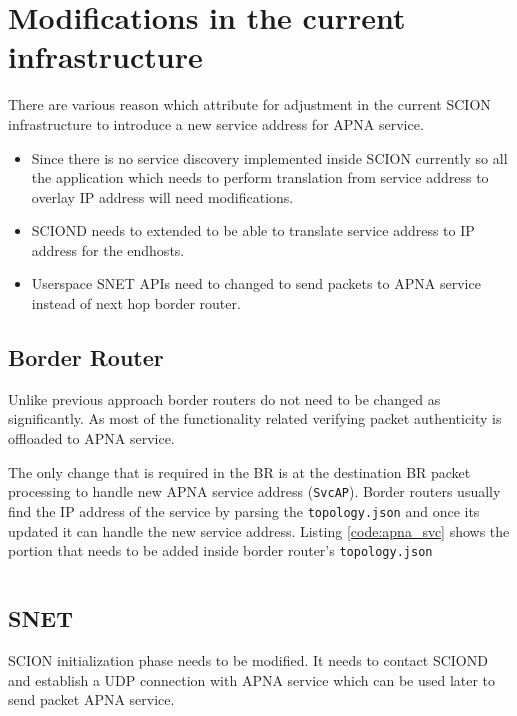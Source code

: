 \section{Modifications in the current infrastructure}
There are various reason which attribute for adjustment in the current SCION infrastructure to introduce a new service address for APNA service.

\begin{itemize}
    \item Since there is no service discovery implemented inside SCION currently so all the application which needs to perform translation from service address to overlay IP address will need modifications.
    \item SCIOND needs to extended to be able to translate service address to IP address for the endhosts.
    \item Userspace SNET APIs need to changed to send packets to APNA service instead of next hop border router.
\end{itemize}

\subsection{Border Router}
Unlike previous approach border routers do not need to be changed as significantly. As most of the functionality related verifying packet authenticity is offloaded to APNA service.

The only change that is required in the BR is at the destination BR packet processing to handle new APNA service address (\texttt{SvcAP}). Border routers usually find the IP address of the service by parsing the \texttt{topology.json} and once its updated it can handle the new service address. Listing \ref{code:apna_svc} shows the portion that needs to be added inside border router's \texttt{topology.json}

\begin{code}
\inputminted[frame=lines, framesep=2mm, baselinestretch=1.2, fontsize=\footnotesize, linenos]{json}{code_snippets/apnasvc.json} \label{code:apna_svc}
\end{code}

\subsection{SNET}
SCION initialization phase needs to be modified. It needs to contact SCIOND and establish a UDP connection with APNA service which can be used later to send packet APNA service.

